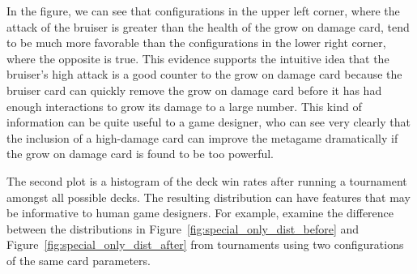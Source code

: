 In the figure, we can see that configurations in the upper left corner, where the attack of the bruiser is greater than the health of the grow on damage card, tend to be much more favorable than the configurations in the lower right corner, where the opposite is true. This evidence supports the intuitive idea that the bruiser's high attack is a good counter to the grow on damage card because the bruiser card can quickly remove the grow on damage card before it has had enough interactions to grow its damage to a large number. This kind of information can be quite useful to a game designer, who can see very clearly that the inclusion of a high-damage card can improve the metagame dramatically if the grow on damage card is found to be too powerful.

The second plot is a histogram of the deck win rates after running a tournament amongst all possible decks. %
The resulting distribution can have features that may be informative to human game designers. For example, examine the difference between the distributions %
in Figure~\ref{fig:special_only_dist_before} and Figure~\ref{fig:special_only_dist_after} from tournaments using two configurations of the same card parameters. 


